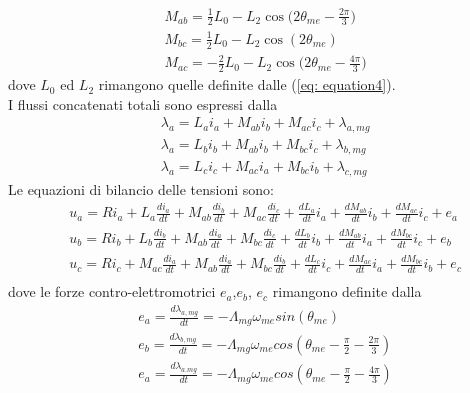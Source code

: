 \begin{equation}
\begin{aligned}
    & M_{ab}= \frac{1}{2}L_0-L_2\cos{\Big(2\theta_{me}-\frac{2\pi}{3}\Big)} \\
    & M_{bc}= \frac{1}{2}L_0-L_2\cos{(2\theta_{me})} \\
    & M_{ac}=-\frac{2}{2}L_0-L_2\cos{\Big(2\theta_{me}-\frac{4\pi}{3}\Big)}
\end{aligned}
\label{eq: equation4}
\end{equation}
dove $L_0$ ed $L_2$ rimangono  quelle definite dalle (\ref{eq: equation4}).\\
I flussi concatenati totali sono espressi dalla
\begin{equation}
\begin{aligned}
    & \lambda_a= L_ai_a+M_{ab}i_b+ M_{ac}i_c+ \lambda_{a,mg} \\
    & \lambda_a= L_bi_b+M_{ab}i_b+ M_{bc}i_c+ \lambda_{b,mg} \\
    & \lambda_a= L_ci_c+M_{ac}i_a+ M_{bc}i_b+ \lambda_{c,mg}
\end{aligned}
\label{eq: equation9}
\end{equation}
Le equazioni di bilancio delle tensioni sono:
\begin{equation}
\begin{aligned}
    & u_a= Ri_a+L_a\frac{di_a}{dt}+M_{ab}\frac{di_b}{dt}+M_{ac}\frac{di_c}{dt}+\frac{dL_a}{dt}i_a+\frac{dM_{ab}}{dt}i_b+\frac{dM_{ac}}{dt}i_c+e_a\\
    & u_b= Ri_b+L_b\frac{di_b}{dt}+M_{ab}\frac{di_a}{dt}+M_{bc}\frac{di_c}{dt}+\frac{dL_b}{dt}i_b+\frac{dM_{ab}}{dt}i_a+\frac{dM_{bc}}{dt}i_c+e_b \\
    & u_c= Ri_c+M_{ac}\frac{di_a}{dt}+M_{ab}\frac{di_a}{dt}+M_{bc}\frac{di_b}{dt}+\frac{dL_c}{dt}i_c+\frac{dM_{ac}}{dt}i_a+\frac{dM_{bc}}{dt}i_b+e_c \\
\end{aligned}
\label{eq: equation7}
\end{equation}
dove le forze contro-elettromotrici $e_a$,$e_b$, $e_c$ rimangono definite dalla
\begin{equation}
\begin{aligned}
    &e_a=\frac{d\lambda_{a,mg}}{dt}=-\Lambda_{mg}\omega_{me}sin(\theta_{me})\\
    &e_b=\frac{d\lambda_{b,mg}}{dt}=-\Lambda_{mg}\omega_{me}cos(\theta_{me}-\frac{\pi}{2}-\frac{2\pi}{3})\\
    &e_a=\frac{d\lambda_{a.mg}}{dt}=-\Lambda_{mg}\omega_{me}cos(\theta_{me}-\frac{\pi}{2}-\frac{4\pi}{3})\\
    \end{aligned}
\label{eq: equation5}
\end{equation}


